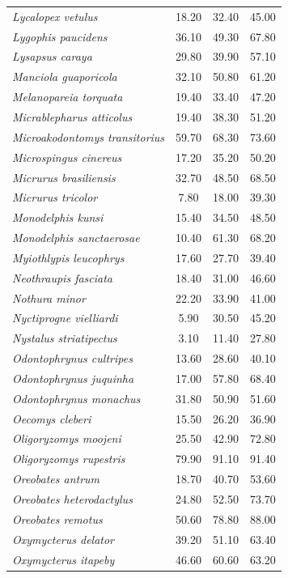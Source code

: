 \documentclass[12pt,openright,oneside,a4paper,english]{abntex2}
\begin{document}
\begin{longtable}{lccc}
	\textit{Lycalopex vetulus}&18.20 &32.40 &45.00 \\
	\textit{Lygophis paucidens}&36.10 &49.30 &67.80 \\
	\textit{Lysapsus caraya}&29.80 &39.90 &57.10 \\
	\textit{Manciola guaporicola}&32.10 &50.80 &61.20 \\
	\textit{Melanopareia torquata}&19.40 &33.40 &47.20 \\
	\textit{Micrablepharus atticolus}&19.40 &38.30 &51.20 \\
	\textit{Microakodontomys transitorius}&59.70 &68.30 &73.60 \\
	\textit{Microspingus cinereus}&17.20 &35.20 &50.20 \\
	\textit{Micrurus brasiliensis}&32.70 &48.50 &68.50 \\
	\textit{Micrurus tricolor}&7.80 &18.00 &39.30 \\
	\textit{Monodelphis kunsi}&15.40 &34.50 &48.50 \\
	\textit{Monodelphis sanctaerosae}&10.40 &61.30 &68.20 \\
	\textit{Myiothlypis leucophrys}&17.60 &27.70 &39.40 \\
	\textit{Neothraupis fasciata}&18.40 &31.00 &46.60 \\
	\textit{Nothura minor}&22.20 &33.90 &41.00 \\
	\textit{Nyctiprogne vielliardi}&5.90 &30.50 &45.20 \\
	\textit{Nystalus striatipectus}&3.10 &11.40 &27.80 \\
	\textit{Odontophrynus cultripes}&13.60 &28.60 &40.10 \\
	\textit{Odontophrynus juquinha}&17.00 &57.80 &68.40 \\
	\textit{Odontophrynus monachus}&31.80 &50.90 &51.60 \\
	\textit{Oecomys cleberi}&15.50 &26.20 &36.90 \\
	\textit{Oligoryzomys moojeni}&25.50 &42.90 &72.80 \\
	\textit{Oligoryzomys rupestris}&79.90 &91.10 &91.40 \\
	\textit{Oreobates antrum}&18.70 &40.70 &53.60 \\
	\textit{Oreobates heterodactylus}&24.80 &52.50 &73.70 \\
	\textit{Oreobates remotus}&50.60 &78.80 &88.00 \\
	\textit{Oxymycterus delator}&39.20 &51.10 &63.40 \\
	\textit{Oxymycterus itapeby}&46.60 &60.60 &63.20 \\

\end{longtable}
\end{document}
